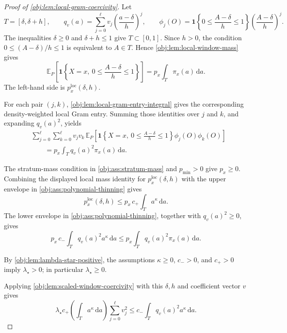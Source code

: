 \begin{proof}[Proof of \cref{obj:lem:local-gram-coercivity}]
Let
\[
        T=[\delta,\delta+h],
        \qquad
        q_v(a)=\sum_{j=0}^{\ell}v_j\left(\frac{a-\delta}{h}\right)^j,
        \qquad
        \phi_j(O)=\mathbf 1\!\left\{0\le\frac{A-\delta}{h}\le1\right\}
        \left(\frac{A-\delta}{h}\right)^j .
\]
The inequalities \(\delta\ge0\) and \(\delta+h\le1\) give \(T\subset[0,1]\).  Since \(h>0\), the condition \(0\le(A-\delta)/h\le1\) is equivalent to \(A\in T\).  Hence \cref{obj:lem:local-window-mass} gives
\[
 \mathbb E_P\!\left[
 \mathbf 1\!\left\{X=x,\ 0\le\frac{A-\delta}{h}\le1\right\}\right]
 =
 p_x\int_T \pi_x(a)\,\mathrm da .
\]
The left-hand side is \(p_x^{\mathrm{loc}}(\delta,h)\).

For each pair \((j,k)\), \cref{obj:lem:local-gram-entry-integral} gives the corresponding density-weighted local Gram entry.  Summing those identities over \(j\) and \(k\), and expanding \(q_v(a)^2\), yields
\[
\begin{aligned}
&\sum_{j=0}^{\ell}\sum_{k=0}^{\ell}
v_jv_k\,
\mathbb E_P\!\left[
\mathbf 1\!\left\{X=x,\ 0\le \frac{A-\delta}{h}\le 1\right\}
\phi_j(O)\phi_k(O)\right]  \\
&\hspace{2em}=
p_x\int_T q_v(a)^2\pi_x(a)\,\mathrm da .
\end{aligned}
\]

The stratum-mass condition in \cref{obj:ass:stratum-mass} and \(p_{\min}>0\) give \(p_x\ge0\).  Combining the displayed local mass identity for \(p_x^{\mathrm{loc}}(\delta,h)\) with the upper envelope in \cref{obj:ass:polynomial-thinning} gives
\[
        p_x^{\mathrm{loc}}(\delta,h)
        \le
        p_x\,c_+\int_T a^\kappa\,\mathrm da .
\]
The lower envelope in \cref{obj:ass:polynomial-thinning}, together with \(q_v(a)^2\ge0\), gives
\[
        p_x\,c_-\int_T q_v(a)^2a^\kappa\,\mathrm da
        \le
        p_x\int_T q_v(a)^2\pi_x(a)\,\mathrm da .
\]

By \cref{obj:lem:lambda-star-positive}, the assumptions \(\kappa\ge0\), \(c_->0\), and \(c_+>0\) imply \(\lambda_\star>0\); in particular \(\lambda_\star\ge0\).

Applying \cref{obj:lem:scaled-window-coercivity} with this \(\delta,h\) and coefficient vector \(v\) gives
\[
 \lambda_\star c_+\!\left(\int_T a^\kappa\,\mathrm da\right)
 \sum_{j=0}^{\ell}v_j^2
 \le
 c_-\int_T q_v(a)^2a^\kappa\,\mathrm da .
\]


\end{proof}
